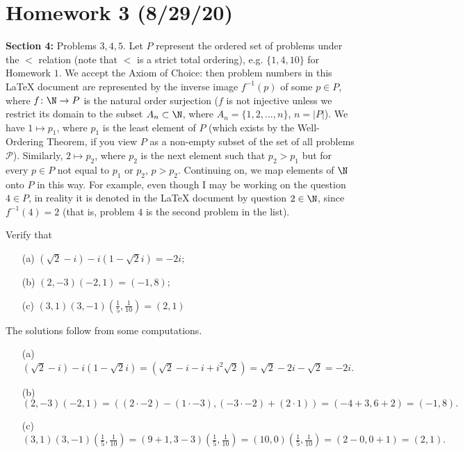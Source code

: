 \section*{Homework 3 (8/29/20)}
\textbf{Section 4:} Problems $3, 4, 5$. Let $P$ represent the ordered set of problems under the $<$ relation (note that $<$ is a strict total ordering), e.g. $\{ 1,4,10 \}$ for Homework $1$. We accept the Axiom of Choice: then problem numbers in this \LaTeX{} document are represented by the inverse image $f^{-1}(p)$ of some $p \in P$, where $f \colon \N \to P$ is the natural order surjection ($f$ is not injective unless we restrict its domain to the subset $A_n \subset \N$, where $A_n = \{1,2, ... , n\}$, $n=|P|$). We have $1 \mapsto p_1$, where $p_1$ is the least element of $P$ (which exists by the Well-Ordering Theorem, if you view $P$ as a non-empty subset of the set of all problems $\mathscr{P}$). Similarly, $2 \mapsto p_2$, where $p_2$ is the next element such that $p_2 > p_1$ but for every $p \in P$ not equal to $p_1$ or $p_2$, $p > p_2.$ Continuing on, we map elements of $\N$ onto $P$ in this way. For example, even though I may be working on the question $4 \in P$, in reality it is denoted in the \LaTeX{} document by question $2 \in \N$, since $f^{-1}(4)=2$ (that is, problem $4$ is the second problem in the list).

\begin{problem}[Question 1]
    Verify that
    \begin{enumerate}
        \item[(a)] $(\sqrt{2} - i) - i(1-\sqrt{2} i)=-2i;$ 
        \item[(b)] $(2,-3)(-2, 1) = (-1,8);$ 
        \item[(c)] $(3,1)(3,-1)\left( \frac{1}{5},\frac{1}{10} \right) =(2,1)$
    \end{enumerate}
\end{problem}
\begin{solution}
    The solutions follow from some computations.
    \begin{enumerate}
        \item[(a)] $(\sqrt{2} -i)-i(1-\sqrt{2} i)  = (\sqrt{2} -i-i+i^2\sqrt{2} ) = \sqrt{2} -2i-\sqrt{2} = -2i$.
        \item[(b)] $(2,-3)(-2,1)=(\left( 2\cdot-2 \right)  - \left( 1\cdot -3 \right) , \left( -3\cdot -2 \right)  + \left( 2\cdot1 \right) ) = (-4+3, 6+2)=(-1,8).$
        \item[(c)] $(3,1)(3,-1)\left( \frac{1}{5},\frac{1}{10} \right) = (9+1,3-3)\left( \frac{1}{5},\frac{1}{10} \right) = (10,0)\left( \frac{1}{5},\frac{1}{10} \right) = (2-0, 0+1)=(2,1). $
    \end{enumerate}
\end{solution}
    
